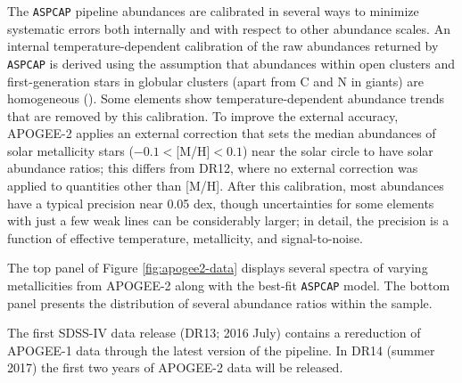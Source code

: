 The {\tt ASPCAP} pipeline abundances are calibrated in several ways to
minimize systematic errors both internally and with respect to other
abundance scales. An internal temperature-dependent calibration of the
raw abundances returned by {\tt ASPCAP} is derived using the
assumption that abundances within open clusters and first-generation
stars in globular clusters (apart from C and N in giants) are
homogeneous (\citealt{desilva06a, desilva07a}). Some elements show
temperature-dependent abundance trends that are removed by this
calibration.  To improve the external accuracy, APOGEE-2 applies an
external correction that sets the median abundances of solar
metallicity stars ($-0.1<$[M/H]$<0.1$) near the solar circle to have
solar abundance ratios; this differs from DR12, where no external
correction was applied to quantities other than [M/H].  After this
calibration, most abundances have a typical precision near 0.05 dex,
though uncertainties for some elements with just a few weak lines
can be considerably larger; in detail, the precision is a function of
effective temperature, metallicity, and signal-to-noise.

The top panel of Figure \ref{fig:apogee2-data} displays several
spectra of varying metallicities from APOGEE-2 along with the best-fit
{\tt ASPCAP} model. The bottom panel presents the distribution of
several abundance ratios within the sample.

The first SDSS-IV data release (DR13; 2016 July) contains a
rereduction of APOGEE-1 data through the latest version of the
pipeline. In DR14 (summer 2017) the first two years of APOGEE-2 data
will be released.
